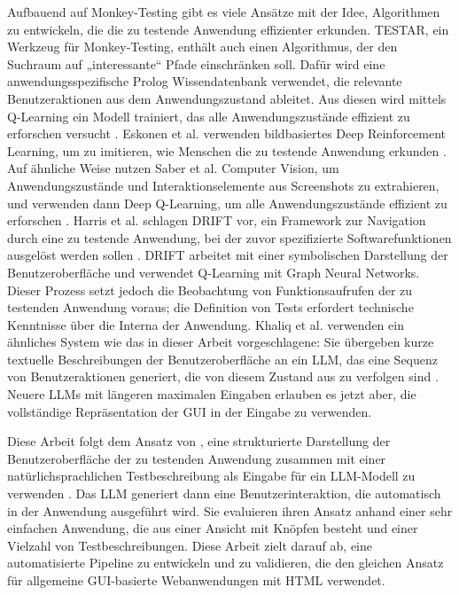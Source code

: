 Aufbauend auf Monkey-Testing gibt es viele Ansätze mit der Idee, Algorithmen zu entwickeln, die die zu testende Anwendung effizienter erkunden.
TESTAR, ein Werkzeug für Monkey-Testing, enthält auch einen Algorithmus, der den Suchraum auf „interessante“ Pfade einschränken soll.
Dafür wird eine anwendungsspezifische Prolog Wissendatenbank verwendet, die relevante Benutzeraktionen aus dem Anwendungszustand ableitet.
Aus diesen wird mittels Q-Learning ein Modell trainiert, das alle Anwendungszustände effizient zu erforschen versucht \cite{testar-q-learning}.
Eskonen et al. verwenden bildbasiertes Deep Reinforcement Learning, um zu imitieren, wie Menschen die zu testende Anwendung erkunden \cite{deep_reinforcement_exploring}.
Auf ähnliche Weise nutzen Saber et al. Computer Vision, um Anwendungszustände und Interaktionselemente aus Screenshots zu extrahieren, und verwenden dann Deep Q-Learning, um alle Anwendungszustände effizient zu erforschen \cite{saber_testing}. 
Harris et al. schlagen DRIFT vor, ein Framework zur Navigation durch eine zu testende Anwendung, bei der zuvor spezifizierte Softwarefunktionen ausgelöst werden sollen \cite{harries2020drift}.
DRIFT arbeitet mit einer symbolischen Darstellung der Benutzeroberfläche und verwendet Q-Learning mit Graph Neural Networks.
Dieser Prozess setzt jedoch die Beobachtung von Funktionsaufrufen der zu testenden Anwendung voraus; die Definition von Tests erfordert technische Kenntnisse über die Interna der Anwendung.
Khaliq et al. verwenden ein ähnliches System wie das in dieser Arbeit vorgeschlagene: Sie übergeben kurze textuelle Beschreibungen der Benutzeroberfläche an ein LLM, das eine Sequenz von Benutzeraktionen generiert, die von diesem Zustand aus zu verfolgen sind \cite{transformers_exploratory}.
Neuere LLMs mit längeren maximalen Eingaben erlauben es jetzt aber, die vollständige Repräsentation der GUI in der Eingabe zu verwenden.

Diese Arbeit folgt dem Ansatz von , eine strukturierte Darstellung der Benutzeroberfläche der zu testenden Anwendung zusammen mit einer natürlichsprachlichen Testbeschreibung als Eingabe für ein LLM-Modell zu verwenden \cite{GPT3Testing}.
Das LLM generiert dann eine Benutzerinteraktion, die automatisch in der Anwendung ausgeführt wird.
Sie evaluieren ihren Ansatz anhand einer sehr einfachen Anwendung, die aus einer Ansicht mit Knöpfen besteht und einer Vielzahl von Testbeschreibungen.
Diese Arbeit zielt darauf ab, eine automatisierte Pipeline zu entwickeln und zu validieren, die den gleichen Ansatz für allgemeine GUI-basierte Webanwendungen mit HTML verwendet.

